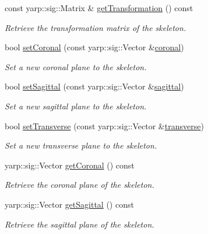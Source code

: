 \begin{DoxyCompactItemize}
const yarp\+::sig\+::\+Matrix \& \mbox{\hyperlink{classassistive__rehab_1_1Skeleton_a2bdcc0d686a5a232aa2c07528cf2e647}{get\+Transformation}} () const
\begin{DoxyCompactList}\small\item\em Retrieve the transformation matrix of the skeleton. \end{DoxyCompactList}\item 
bool \mbox{\hyperlink{classassistive__rehab_1_1Skeleton_ab3bd697f48ea69cfdc5ff7574c19041f}{set\+Coronal}} (const yarp\+::sig\+::\+Vector \&\mbox{\hyperlink{classassistive__rehab_1_1Skeleton_ad042a7e60e6d72cc87b06c5fb0bdfae2}{coronal}})
\begin{DoxyCompactList}\small\item\em Set a new coronal plane to the skeleton. \end{DoxyCompactList}\item 
bool \mbox{\hyperlink{classassistive__rehab_1_1Skeleton_af92fdb0e3eb88a0b1dedd5038e2c6eb7}{set\+Sagittal}} (const yarp\+::sig\+::\+Vector \&\mbox{\hyperlink{classassistive__rehab_1_1Skeleton_a72d6ccb619619e77a17258b08496a972}{sagittal}})
\begin{DoxyCompactList}\small\item\em Set a new sagittal plane to the skeleton. \end{DoxyCompactList}\item 
bool \mbox{\hyperlink{classassistive__rehab_1_1Skeleton_a1aeba05a17363afc08c30397d17375df}{set\+Transverse}} (const yarp\+::sig\+::\+Vector \&\mbox{\hyperlink{classassistive__rehab_1_1Skeleton_ab8a9bf9297f520e8de801248e0b8d2dd}{transverse}})
\begin{DoxyCompactList}\small\item\em Set a new transverse plane to the skeleton. \end{DoxyCompactList}\item 
yarp\+::sig\+::\+Vector \mbox{\hyperlink{classassistive__rehab_1_1Skeleton_aa241a0ac93a9ead198f985073c8935eb}{get\+Coronal}} () const
\begin{DoxyCompactList}\small\item\em Retrieve the coronal plane of the skeleton. \end{DoxyCompactList}\item 
yarp\+::sig\+::\+Vector \mbox{\hyperlink{classassistive__rehab_1_1Skeleton_a83133fabc903ddd4e54edf59df977167}{get\+Sagittal}} () const
\begin{DoxyCompactList}\small\item\em Retrieve the sagittal plane of the skeleton. \end{DoxyCompactList}\item 

\end{DoxyCompactItemize}
